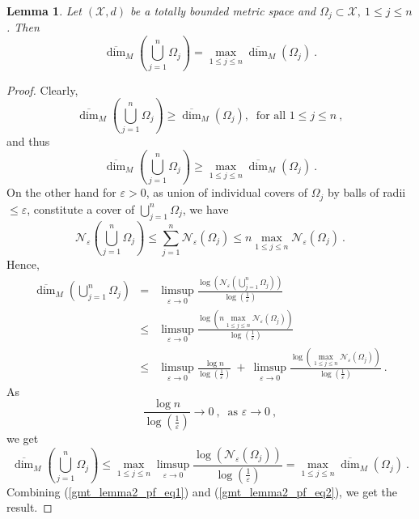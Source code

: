 \documentclass[12pt]{amsart}
\newtheorem{lemma}[theorem]{Lemma}
\theoremstyle{definition}
\numberwithin{equation}{section}
\begin{document}
\begin{lemma} \label{gmt_lemma2}
Let  $\left(\mathcal{X},d\right)$ be a totally bounded metric space and $\Omega_j \subset \mathcal{X},\:1\le j \le n$. Then 
\begin{equation*}
\overline{\dim}_M\left(\bigcup_{j=1}^n\Omega_j\right) = \max_{1 \le j \le n}\overline{\dim}_M\left(\Omega_j\right)\:.
\end{equation*} 
\end{lemma}
\begin{proof}
Clearly, $$\overline{\dim}_M\left(\bigcup_{j=1}^n\Omega_j\right) \ge \overline{\dim}_M\left(\Omega_j\right),\:\text{ for all } 1\le j \le n\:,$$
and thus
\begin{equation} \label{gmt_lemma2_pf_eq1}
\overline{\dim}_M\left(\bigcup_{j=1}^n\Omega_j\right) \ge \max_{1 \le j \le n}\overline{\dim}_M\left(\Omega_j\right)\:.
\end{equation}
On the other hand for $\varepsilon>0$, as union of individual covers of $\Omega_j$ by balls of radii $\le \varepsilon$, constitute a cover of $\bigcup_{j=1}^n\Omega_j$, we have
\begin{equation*}
\mathcal{N}_{\varepsilon}\left(\bigcup_{j=1}^n\Omega_j\right) \le \sum_{j=1}^n \mathcal{N}_{\varepsilon}\left(\Omega_j\right) \le n \max_{1 \le j \le n} \mathcal{N}_{\varepsilon}\left(\Omega_j\right)\:.
\end{equation*}
Hence,
\begin{eqnarray*}
\overline{\dim}_M\left(\bigcup_{j=1}^n\Omega_j\right) &=& \limsup_{\varepsilon \to 0} \frac{\log\left(\mathcal{N}_{\varepsilon}\left(\bigcup_{j=1}^n\Omega_j\right)\right)}{\log\left(\frac{1}{\varepsilon}\right)} \\
& \le & \limsup_{\varepsilon \to 0} \frac{\log\left(n \displaystyle\max_{1 \le j \le n} \mathcal{N}_{\varepsilon}\left(\Omega_j\right)\right)}{\log\left(\frac{1}{\varepsilon}\right)} \\
& \le & \limsup_{\varepsilon \to 0} \frac{\log n}{\log\left(\frac{1}{\varepsilon}\right)} \:+\: \limsup_{\varepsilon \to 0} \frac{\log\left( \displaystyle\max_{1 \le j \le n} \mathcal{N}_{\varepsilon}\left(\Omega_j\right)\right)}{\log\left(\frac{1}{\varepsilon}\right)} \:.
\end{eqnarray*}
As
\begin{equation*}
\frac{\log n}{\log\left(\frac{1}{\varepsilon}\right)} \to 0\:,\:\text{ as } \varepsilon \to 0\:,
\end{equation*}
we get
\begin{equation}\label{gmt_lemma2_pf_eq2}
\overline{\dim}_M\left(\bigcup_{j=1}^n\Omega_j\right) \le \max_{1 \le j \le n} \limsup_{\varepsilon \to 0} \frac{\log\left( \mathcal{N}_{\varepsilon}\left(\Omega_j\right)\right)}{\log\left(\frac{1}{\varepsilon}\right)} = \max_{1 \le j \le n} \overline{\dim}_M\left(\Omega_j\right)\:.
\end{equation}
Combining (\ref{gmt_lemma2_pf_eq1}) and (\ref{gmt_lemma2_pf_eq2}), we get the result.
\end{proof}
\end{document}
